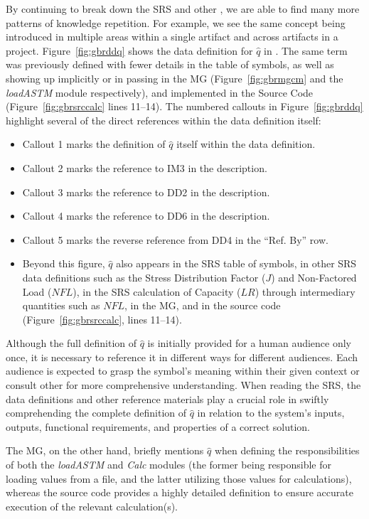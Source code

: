 By continuing to break down the SRS and other \sfs{}, we are able to find many
more patterns of knowledge repetition. For example, we see the same concept 
being introduced in multiple areas within a single artifact and across 
artifacts in a project.
Figure~\ref{fig:gbrddq} shows the data definition for $\hat{q}$ in \gb{}. The 
same term was previously defined with fewer details in the table of symbols, as 
well as showing up implicitly or in passing in the MG (Figure~\ref{fig:gbrmgcm} 
and the \emph{loadASTM} module respectively), and implemented in the Source 
Code (Figure~\ref{fig:gbrsrccalc} lines 11--14). The numbered 
callouts in Figure~\ref{fig:gbrddq} highlight several of the direct references 
within the data definition itself:

\begin{itemize}
\item Callout 1 marks the definition of $\hat{q}$ itself within the data 
definition.
\item Callout 2 marks the reference to IM3 in the description.
\item Callout 3 marks the reference to DD2 in the description.
\item Callout 4 marks the reference to DD6 in the description.
\item Callout 5 marks the reverse reference from DD4 in the ``Ref. By'' row.
\item Beyond this figure, $\hat{q}$ also appears in the SRS table of symbols, 
in other SRS data definitions such as the Stress Distribution Factor ($J$) and 
Non-Factored Load ($\mathit{NFL}$), in the SRS calculation of Capacity ($LR$) 
through intermediary quantities such as $\mathit{NFL}$, in the MG, and in the 
source code (Figure~\ref{fig:gbrsrccalc}, lines 11--14).
\end{itemize}


Although the full definition of $\hat{q}$ is initially provided 
for a human audience only once, it is necessary to reference it in different 
ways for different audiences. Each audience is expected to grasp the symbol's 
meaning within their given context or consult other \sfs{} for more 
comprehensive understanding. When reading the SRS, the data definitions and 
other reference materials play a crucial role in swiftly comprehending the 
complete definition of $\hat{q}$ in relation to the system's inputs, outputs, 
functional requirements, and properties of a correct solution.

The MG, on the other hand, briefly mentions $\hat{q}$ when defining the 
responsibilities of both the \emph{loadASTM} and \emph{Calc} modules (the 
former being responsible for loading values from a file, and the latter 
utilizing those values for calculations), whereas the source code provides a 
highly detailed definition to ensure accurate execution of the relevant 
calculation(s).

